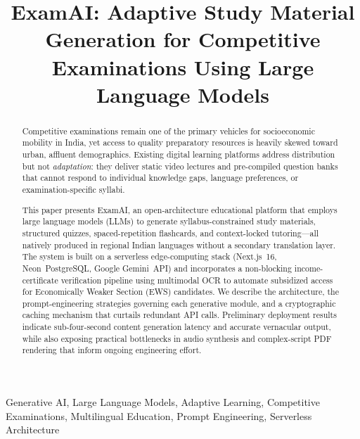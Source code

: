 \documentclass[conference]{IEEEtran}
\begin{document}
\title{ExamAI: Adaptive Study Material Generation for Competitive Examinations Using Large Language Models}

\author{
}

\maketitle

\begin{abstract}
Competitive examinations remain one of the primary vehicles for socioeconomic mobility in India, yet access to quality preparatory resources is heavily skewed toward urban, affluent demographics. Existing digital learning platforms address distribution but not \textit{adaptation}: they deliver static video lectures and pre-compiled question banks that cannot respond to individual knowledge gaps, language preferences, or examination-specific syllabi.

This paper presents ExamAI, an open-architecture educational platform that employs large language models (LLMs) to generate syllabus-constrained study materials, structured quizzes, spaced-repetition flashcards, and context-locked tutoring---all natively produced in regional Indian languages without a secondary translation layer. The system is built on a serverless edge-computing stack (Next.js~16, Neon~PostgreSQL, Google Gemini~API) and incorporates a non-blocking income-certificate verification pipeline using multimodal OCR to automate subsidized access for Economically Weaker Section (EWS) candidates. We describe the architecture, the prompt-engineering strategies governing each generative module, and a cryptographic caching mechanism that curtails redundant API calls. Preliminary deployment results indicate sub-four-second content generation latency and accurate vernacular output, while also exposing practical bottlenecks in audio synthesis and complex-script PDF rendering that inform ongoing engineering effort.
\end{abstract}

\begin{IEEEkeywords}
Generative AI, Large Language Models, Adaptive Learning, Competitive Examinations, Multilingual Education, Prompt Engineering, Serverless Architecture
\end{IEEEkeywords}
\end{document}
